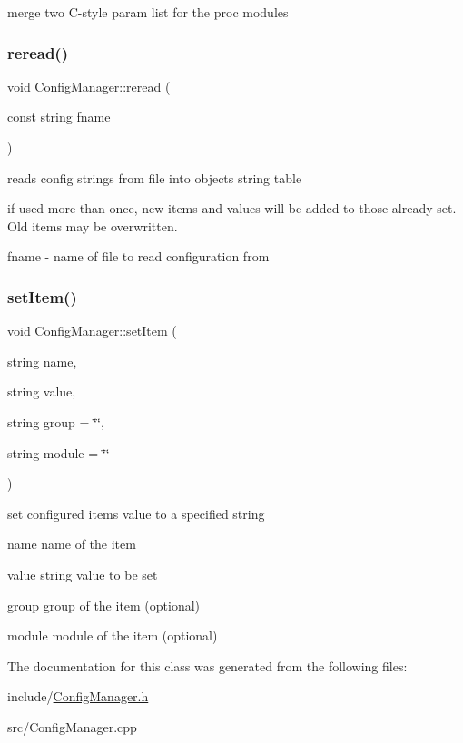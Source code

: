 merge two C-\/style param list for the proc modules \mbox{\label{classConfigManager_af4ffb3955f672a1dd0fb1db39d231c2a}} 
\subsubsection{\texorpdfstring{reread()}{reread()}}
{\footnotesize\ttfamily void Config\+Manager\+::reread (\begin{DoxyParamCaption}\item[{const string}]{fname }\end{DoxyParamCaption})}



reads config strings from file into object\textquotesingle{}s string table 

if used more than once, new items and values will be added to those already set. Old items may be overwritten.

\begin{DoxyItemize}
\item {\ttfamily fname} -\/ name of file to read configuration from \end{DoxyItemize}
\mbox{\label{classConfigManager_a63619a561041c0d5e11c7751b5d999e8}} 
\subsubsection{\texorpdfstring{set\+Item()}{setItem()}}
{\footnotesize\ttfamily void Config\+Manager\+::set\+Item (\begin{DoxyParamCaption}\item[{string}]{name,  }\item[{string}]{value,  }\item[{string}]{group = {\ttfamily \char`\"{}\char`\"{}},  }\item[{string}]{module = {\ttfamily \char`\"{}\char`\"{}} }\end{DoxyParamCaption})}



set configured item\textquotesingle{}s value to a specified string 

\begin{DoxyItemize}
\item {\ttfamily name} name of the item \item {\ttfamily value} string value to be set \item {\ttfamily group} group of the item (optional) \item {\ttfamily module} module of the item (optional) \end{DoxyItemize}


The documentation for this class was generated from the following files\+:\begin{DoxyCompactItemize}
\item 
include/\hyperlink{ConfigManager_8h}{Config\+Manager.\+h}\item 
src/Config\+Manager.\+cpp\end{DoxyCompactItemize}
